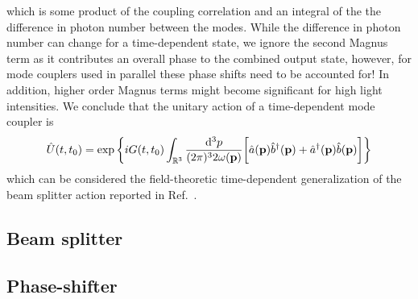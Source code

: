 which is some product of the coupling correlation and an integral of the the difference in photon number between the modes.
While the difference in photon number can change for a time-dependent state, we ignore the second Magnus term as it contributes an overall phase to the combined output state, however, for mode couplers used in parallel these phase shifts need to be accounted for!
In addition, higher order Magnus terms might become significant for high light intensities.
We conclude that the unitary action of a time-dependent mode coupler is
\begin{equation}
	\hat{U}(t,t_0)
	=
	\exp\left\{
		iG(t,t_0)
		\int_{\mathbb{R}^3}
		\frac{\dd[3]{p}}{(2\pi)^32\omega(\vb{p})}
		\biggl[
			\hat{a}(\vb{p})
			\hat{b}^\dagger(\vb{p})
			+
			\hat{a}^\dagger(\vb{p})
			\hat{b}(\vb{p})
		\biggr]
	\right\}
\end{equation}
which can be considered the field-theoretic time-dependent generalization of the beam splitter action reported in Ref.~\cite{Leonhardt2003,Haroche2006}.

\subsection{Beam splitter}

\subsection{Phase-shifter}